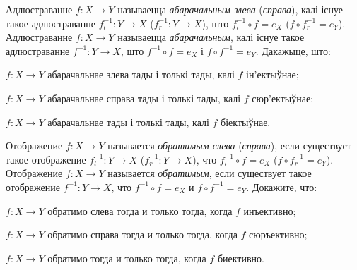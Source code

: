 \begin{problemList}
\problemItemSimple
{%
Адлюстраванне $f \colon X \to Y$ называецца \textit{абарачальным злева} (\textit{справа}),
калі існуе такое адлюстраванне
$f_l^{-1} \colon Y \to X$ ($f_r^{-1} \colon Y \to X$), што $f_l^{-1} \circ f = e_X$ ($f \circ f_r^{-1} = e_Y$).
Адлюстраванне $f \colon X \to Y$ называецца \textit{абарачальным},
калі існуе такое адлюстраванне $f^{-1} \colon Y \to X$, што $f^{-1} \circ f = e_X$ і $f \circ f^{-1} = e_Y$.
Дакажыце, што:
\begin{belarusianEnumerate}
    \item $f \colon X \to Y$ абарачальнае злева тады і толькі тады, калі $f$ ін'ектыўнае;
    \item $f \colon X \to Y$ абарачальнае справа тады і толькі тады, калі $f$ сюр'ектыўнае;
    \item $f \colon X \to Y$ абарачальнае тады і толькі тады, калі $f$ біектыўнае.
\end{belarusianEnumerate}
}
{%
Отображение $f \colon X \to Y$ называется \textit{обратимым слева} (\textit{справа}),
если существует такое отображение
$f_l^{-1} \colon Y \to X$ ($f_r^{-1} \colon Y \to X$), что $f_l^{-1} \circ f = e_X$ ($f \circ f_r^{-1} = e_Y$).
Отображение $f \colon X \to Y$ называется \textit{обратимым},
если существует такое отображение $f^{-1} \colon Y \to X$, что $f^{-1} \circ f = e_X$ и $f \circ f^{-1} = e_Y$.
Докажите, что:
\begin{russianEnumerate}
    \item $f \colon X \to Y$ обратимо слева тогда и только тогда, когда $f$ инъективно;
    \item $f \colon X \to Y$ обратимо справа тогда и только тогда, когда $f$ сюръективно;
    \item $f \colon X \to Y$ обратимо тогда и только тогда, когда $f$ биективно.
\end{russianEnumerate}
}

\end{problemList}


